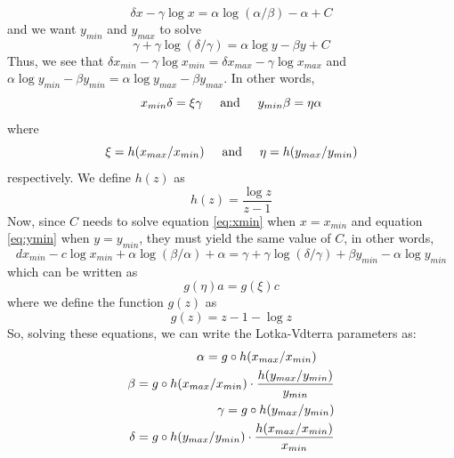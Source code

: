 \documentclass{article}
\begin{document}
\begin{equation}
\delta x - \gamma \log x = \alpha \log (\alpha/\beta) - \alpha + C
\label{eq:xmin}
\end{equation}
and we want $y_{min}$ and $y_{max}$ to solve
\begin{equation}
\gamma + \gamma \log (\delta/\gamma) = \alpha \log y - \beta y + C
\label{eq:ymin}
\end{equation}
Thus, we see that $\delta x_{min} - \gamma \log x_{min} = \delta x_{max} - \gamma \log x_{max}$ and $\alpha \log y_{min} - \beta y_{min} = \alpha \log y_{max} - \beta y_{max}$. In other words, \begin{equation}
x_{min}\delta = \xi \gamma \hspace{0.5 cm} \textrm{and} \hspace{0.5 cm} y_{min} \beta = \eta \alpha
\end{equation}
where
\begin{equation}
\xi = h(x_{max}/x_{min}) \hspace{0.5 cm} \textrm{and} \hspace{0.5 cm} \eta = h(y_{max}/y_{min})
\end{equation}
respectively. We define $h(z)$ as
\begin{equation}
h(z) = \frac{\log z}{z - 1}
\end{equation}
Now, since $C$ needs to solve equation \ref{eq:xmin} when $x = x_{min}$ and equation \ref{eq:ymin} when $y = y_{min}$, they must yield the same value of $C$, in other words,
\begin{equation}
dx_{min} - c\log x_{min} + \alpha \log (\beta/\alpha) + \alpha = \gamma + \gamma \log (\delta/\gamma) + \beta y_{min} - \alpha \log y_{min}
\end{equation}
which can be written as
\begin{equation}
g(\eta) a = g(\xi) c
\end{equation}
where we define the function $g(z)$ as
\begin{equation}
g(z) = z - 1 - \log z
\end{equation}
So, solving these equations, we can write the Lotka-Vdterra parameters as:
\begin{equation}
\begin{split}
\alpha = g \circ h(x_{max}/x_{min}) \hspace{0.5 cm} \\
\beta = g \circ h(x_{max}/x_{min}) \cdot \frac{h(y_{max}/y_{min})}{y_{min}} \\
\gamma = g \circ h(y_{max}/y_{min}) \\
\delta = g \circ h(y_{max}/y_{min}) \cdot \frac{h(x_{max}/x_{min})}{x_{min}}
\end{split}
\end{equation}
\end{document}
